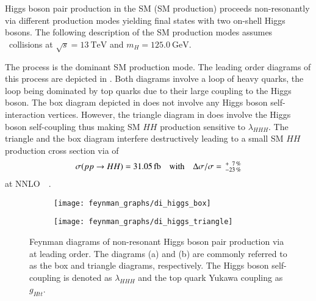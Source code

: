 Higgs boson pair production in the SM (SM \HH production) proceeds
non-resonantly via different production modes yielding final states with two
on-shell Higgs bosons. The following description of the SM \HH production modes
assumes \pp~collisions at $\sqrt{s} = \SI{13}{\TeV}$ and
$m_{H} = \SI{125.0}{\GeV}$.

The \ggF process is the dominant SM \HH production mode. The leading order
diagrams of this process are depicted in . Both
diagrams involve a loop of heavy quarks, the loop being dominated by top quarks
due to their large coupling to the Higgs boson. The box diagram depicted in
 does not involve any Higgs boson
self-interaction vertices.
However, the triangle diagram in
 does involve the Higgs boson self-coupling
thus making SM $HH$ production sensitive to $\lambda_{HHH}$. The triangle and
the box diagram interfere destructively leading to a small SM $HH$ production
cross section via \ggF of
\begin{align*}
  \sigma(pp \to HH) = \SI{31.05}{\femto\barn}
  \quad \text{with} \quad
  \Delta \sigma / \sigma = \valuesep^{+\phantom{2}7\,\%}_{-23\,\%}
\end{align*}
at NNLO~\FTapprox~\cite{Grazzini:2018bsd,Baglio:2020wgt,LHCHWGHH}.

\begin{figure}[htbp]
  \centering

  \begin{subfigure}{0.49\textwidth}
    \centering
    \texttt{[image: feynman\_graphs/di\_higgs\_box]}
    \subcaption{}%
    \label{fig:dihiggs_ggf_feyn_box}
  \end{subfigure}\hfill%
  \begin{subfigure}{0.49\textwidth}
    \centering
    \texttt{[image: feynman\_graphs/di\_higgs\_triangle]}
    \subcaption{}%
    \label{fig:dihiggs_ggf_feyn_triangle}
  \end{subfigure}

  \caption[Feynman diagrams of non-resonant Higgs boson pair production via
  \ggF.]{Feynman diagrams of non-resonant Higgs boson pair production via \ggF
    at leading order. The diagrams (a) and (b) are commonly referred to as the
    box and triangle diagrams, respectively. The Higgs boson self-coupling is
    denoted as $\lambda_{HHH}$ and the top quark Yukawa coupling as $g_{Htt}$.}%
  \label{fig:dihiggs_ggf_feyn}
\end{figure}

